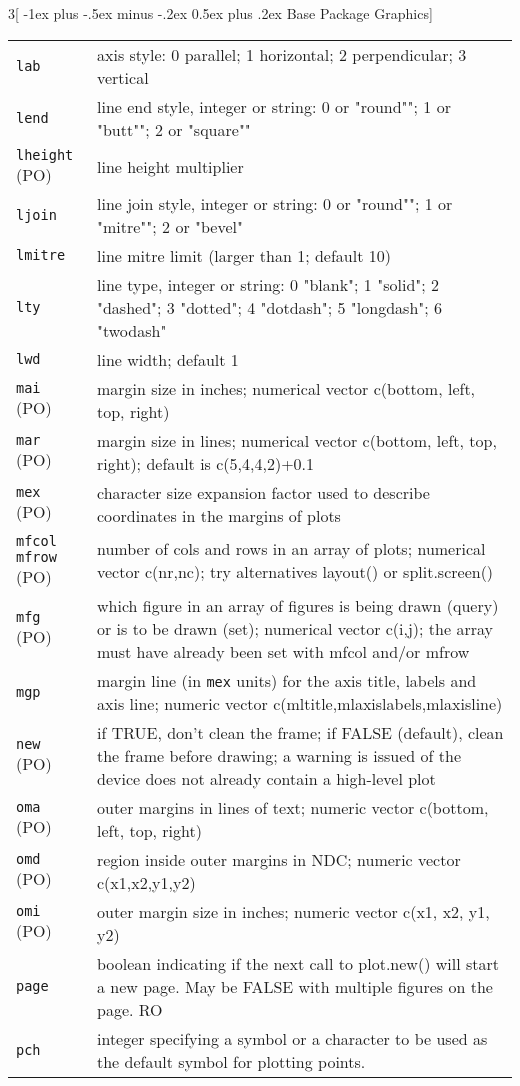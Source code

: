 \documentclass[landscape]{article}
\makeatletter
\renewcommand{\section}{\@startsection{section}{1}{0mm}%
                                {-1ex plus -.5ex minus -.2ex}%
                                {0.5ex plus .2ex}%
                                {\normalfont\large\bfseries}}
\makeatother
\begin{document}
\begin{multicols}{3}[\section{Base Package Graphics}]
\begin{tabular}[t]{@{}p{\widthleftcol}p{\widthrightcol}@{}}
\hline
\verb|lab| & axis style: 0 parallel; 1 horizontal; 2 perpendicular; 3 vertical \\
\verb|lend| & line end style, integer or string: 0 or "round""; 1 or "butt""; 2 or "square"" \\
\verb|lheight| (PO) & line height multiplier \\
\verb|ljoin| & line join style, integer or string: 0 or "round""; 1 or "mitre""; 2 or "bevel" \\
\verb|lmitre| & line mitre limit (larger than 1; default 10) \\
\verb|lty| & line type, integer or string: 0 "blank"; 1 "solid"; 2 "dashed"; 3 "dotted"; 4 "dotdash"; 5 "longdash"; 6 "twodash" \\
\verb|lwd| & line width; default 1 \\
\verb|mai| (PO) & margin size in inches; numerical vector c(bottom, left, top, right) \\
\verb|mar| (PO) & margin size in lines; numerical vector c(bottom, left, top, right); default is c(5,4,4,2)+0.1 \\
\verb|mex| (PO) & character size expansion factor used to describe coordinates in the margins of plots \\
\parbox[t]{\widthleftcol}{
    \texttt{mfcol} \\
    \texttt{mfrow} (PO)
    } & number of cols and rows in an array of plots; numerical vector c(nr,nc); try alternatives layout() or split.screen()  \\
\verb|mfg| (PO) & which figure in an array of figures is being drawn (query) or is to be drawn (set); numerical vector c(i,j); the array must have already been set with mfcol and/or mfrow \\
\verb|mgp| & margin line (in \verb|mex| units) for the axis title, labels and axis line; numeric vector c(mltitle,mlaxislabels,mlaxisline) \\
\verb|new| (PO) & if TRUE, don't clean the frame; if FALSE (default), clean the frame before drawing; a warning is issued of the device does not already contain a high-level plot \\
\verb|oma| (PO) & outer margins in lines of text; numeric vector c(bottom, left, top, right) \\
\verb|omd| (PO) & region inside outer margins in NDC; numeric vector c(x1,x2,y1,y2) \\
\verb|omi| (PO) & outer margin size in inches; numeric vector c(x1, x2, y1, y2) \\
\verb|page| & boolean indicating if the next call to plot.new() will start  a new page. May be FALSE with multiple figures on the page. RO \\
\verb|pch| & integer specifying a symbol or a character to be used as the default symbol for plotting points. \\
\hline 
\end{tabular}


\end{multicols}
\end{document}
